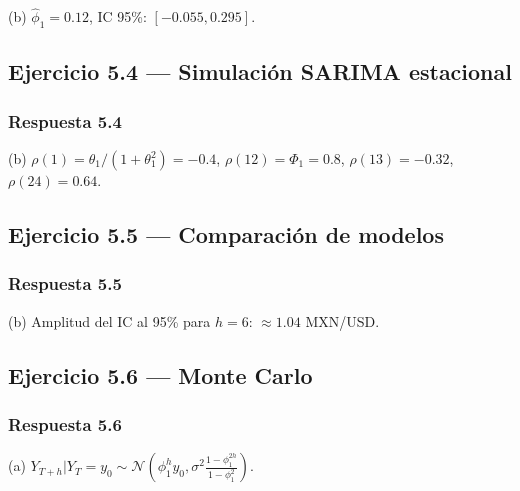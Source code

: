 \documentclass[12pt, letterpaper]{article}
\begin{document}
(b) $\hat{\phi}_1=0.12$, IC 95\%: $[-0.055, 0.295]$.

\subsection{Ejercicio 5.4 — Simulación SARIMA estacional}

\subsubsection*{Respuesta 5.4}

(b) $\rho(1) = \theta_1/(1+\theta_1^2) = -0.4$, $\rho(12)=\Phi_1=0.8$, $\rho(13)=-0.32$, $\rho(24)=0.64$.

\subsection{Ejercicio 5.5 — Comparación de modelos}

\subsubsection*{Respuesta 5.5}

(b) Amplitud del IC al 95\% para $h=6$: $\approx 1.04$ MXN/USD.

\subsection{Ejercicio 5.6 — Monte Carlo}

\subsubsection*{Respuesta 5.6}

(a) $Y_{T+h}|Y_T=y_0 \sim \mathcal{N}\left(\phi_1^h y_0, \sigma^2\frac{1-\phi_1^{2h}}{1-\phi_1^2}\right)$.
\end{document}
